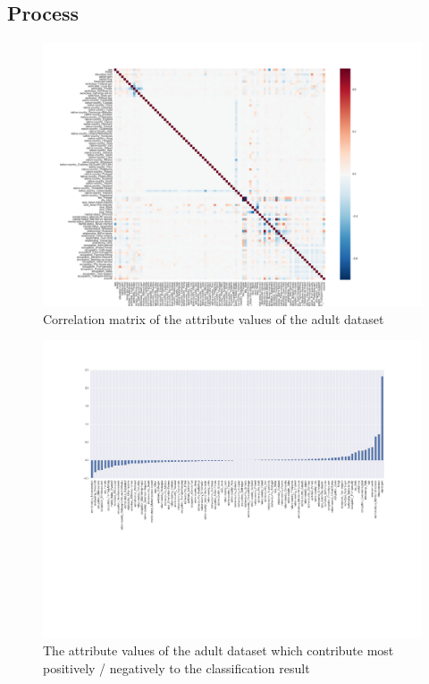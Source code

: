 \documentclass{llncs}
\begin{document}
\subsection{Process}
\label{ssect:process}

\begin{figure}[H]
	\begin{center}
		\includegraphics[width=1\textwidth]{figures/experiment/correlation_big}
		\caption{Correlation matrix of the attribute values of the adult dataset}
		\label{fig:adult_correlation_big}
	\end{center}
\end{figure}

\begin{figure}[H]
	\begin{center}
		\includegraphics[width=1\textwidth]{figures/experiment/important_columns}
		\caption{The attribute values of the adult dataset which contribute most positively / negatively to the classification result}
		\label{fig:adult_important_columns}
	\end{center}
\end{figure}
\end{document}
